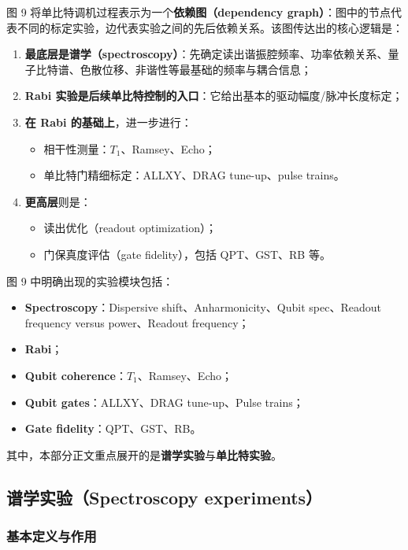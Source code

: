 \documentclass[12pt,a4paper,oneside]{ctexbook}
\begin{document}
图 9 将单比特调机过程表示为一个\textbf{依赖图（dependency graph）}：图中的节点代表不同的标定实验，边代表实验之间的先后依赖关系。该图传达出的核心逻辑是：

\begin{enumerate}
    \item \textbf{最底层是谱学（spectroscopy）}：先确定读出谐振腔频率、功率依赖关系、量子比特谱、色散位移、非谐性等最基础的频率与耦合信息；
    \item \textbf{Rabi 实验是后续单比特控制的入口}：它给出基本的驱动幅度/脉冲长度标定；
    \item \textbf{在 Rabi 的基础上}，进一步进行：
    \begin{itemize}
        \item 相干性测量：\(T_1\)、Ramsey、Echo；
        \item 单比特门精细标定：ALLXY、DRAG tune-up、pulse trains。
    \end{itemize}
    \item \textbf{更高层}则是：
    \begin{itemize}
        \item 读出优化（readout optimization）；
        \item 门保真度评估（gate fidelity），包括 QPT、GST、RB 等。
    \end{itemize}
\end{enumerate}

图 9 中明确出现的实验模块包括：
\begin{itemize}
    \item \textbf{Spectroscopy}：Dispersive shift、Anharmonicity、Qubit spec、Readout frequency versus power、Readout frequency；
    \item \textbf{Rabi}；
    \item \textbf{Qubit coherence}：\(T_1\)、Ramsey、Echo；
    \item \textbf{Qubit gates}：ALLXY、DRAG tune-up、Pulse trains；
    \item \textbf{Gate fidelity}：QPT、GST、RB。
\end{itemize}

其中，本部分正文重点展开的是\textbf{谱学实验}与\textbf{单比特实验}。

\subsection{谱学实验（Spectroscopy experiments）}

\subsubsection{基本定义与作用}
\end{document}
